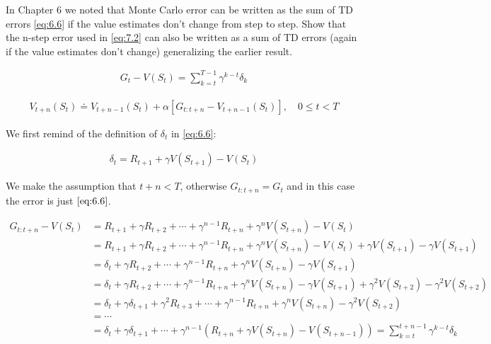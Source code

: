 
\begin{exercise}

In Chapter 6 we noted that Monte Carlo error can be written as the sum of TD errors \eqref{eq:6.6} if the value estimates don't change from step to step. Show that the n-step error used in \eqref{eq:7.2} can also be written as a sum of TD errors (again if the value estimates don't change) generalizing the earlier result.

\begin{align} \label{eq:6.6} \tag{6.6}
    G_t - V(S_t)
    =
    \sum_{k=t}^{T-1}
        \gamma^{k-t}
        \delta_k
\end{align}

\begin{align} \label{eq:7.2} \tag{7.2}
    V_{t+n}(S_t)
    \doteq
    V_{t+n-1}(S_t) + \alpha [G_{t:t+n} - V_{t+n-1}(S_t)],
    \quad
    0 \leq t < T
\end{align}

\end{exercise}


\begin{solution}

We first remind of the definition of $\delta_t$ in \eqref{eq:6.6}:

\begin{align*}
  \delta_t = R_{t+1} + \gamma V(S_{t+1}) - V(S_t)
\end{align*}

We make the assumption that $t+n < T$, otherwise $G_{t:t+n} = G_t$ and in this case the error is just $\eqref{eq:6.6}$.

\begin{align*}
  G_{t:t+n} - V(S_t)
  &=
  R_{t+1} + \gamma R_{t+2} + \cdots + \gamma^{n-1} R_{t+n} + \gamma^n V(S_{t+n}) - V(S_t) \\
  &=
  R_{t+1} + \gamma R_{t+2} + \cdots + \gamma^{n-1} R_{t+n} + \gamma^n V(S_{t+n}) - V(S_t) + \gamma V(S_{t+1}) - \gamma V(S_{t+1}) \\
  &=
  \delta_t + \gamma R_{t+2} + \cdots + \gamma^{n-1} R_{t+n} + \gamma^n V(S_{t+n}) - \gamma V(S_{t+1}) \\
  &=
  \delta_t + \gamma R_{t+2} + \cdots + \gamma^{n-1} R_{t+n} + \gamma^n V(S_{t+n}) - \gamma V(S_{t+1}) + \gamma^2 V(S_{t+2}) - \gamma^2 V(S_{t+2}) \\
  &=
  \delta_t + \gamma \delta_{t+1} + \gamma^2 R_{t+3} + \cdots + \gamma^{n-1} R_{t+n} + \gamma^n V(S_{t+n}) - \gamma^2 V(S_{t+2}) \\
  &=
  \cdots \\
  &=
  \delta_t + \gamma \delta_{t+1}+ \cdots + \gamma^{n-1}(R_{t+n} + \gamma V(S_{t+n}) - V(S_{t+n-1}))
  =
  \sum_{k=t}^{t+n-1} \gamma^{k-t}\delta_k
\end{align*}

\end{solution}

